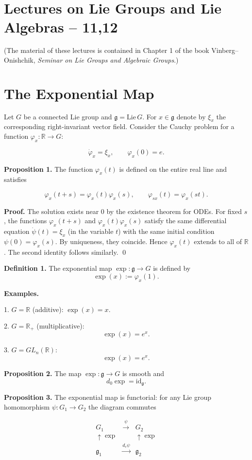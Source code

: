 \section*{Lectures on Lie Groups and Lie Algebras – 11,12}

(The material of these lectures is contained in Chapter 1 of the book
Vinberg–Onishchik, \emph{Seminar on Lie Groups and Algebraic Groups}.)

\section*{The Exponential Map}

Let $G$ be a connected Lie group and $\mathfrak g = \mathrm{Lie}\,G$.
For $x \in \mathfrak g$ denote by $\xi_x$ the corresponding right-invariant
vector field. Consider the Cauchy problem for a function
$\varphi_x : \mathbb{R} \to G$:

\[
\dot\varphi_x = \xi_x, \qquad \varphi_x(0) = e.
\]

\textbf{Proposition 1.}
The function $\varphi_x(t)$ is defined on the entire real line and satisfies

\[
\varphi_x(t+s) = \varphi_x(t)\varphi_x(s),
\qquad
\varphi_{sx}(t) = \varphi_x(st).
\]

\textbf{Proof.}
The solution exists near $0$ by the existence theorem for ODEs.
For fixed $s$, the functions $\varphi_x(t+s)$ and
$\varphi_x(t)\varphi_x(s)$ satisfy the same differential equation
$\dot\psi(t)=\xi_x$ (in the variable $t$) with the same initial condition
$\psi(0)=\varphi_x(s)$. By uniqueness, they coincide.
Hence $\varphi_x(t)$ extends to all of $\mathbb{R}$.
The second identity follows similarly.
\qed

\textbf{Definition 1.}
The exponential map $\exp : \mathfrak g \to G$ is defined by
\[
\exp(x) := \varphi_x(1).
\]

\textbf{Examples.}

1. $G=\mathbb{R}$ (additive): $\exp(x)=x$.

2. $G=\mathbb{R}_+$ (multiplicative):
\[
\exp(x)=e^x.
\]

3. $G=GL_n(\mathbb{R})$:
\[
\exp(x)=e^x.
\]

\textbf{Proposition 2.}
The map $\exp : \mathfrak g \to G$ is smooth and
\[
d_0 \exp = \mathrm{id}_{\mathfrak g}.
\]

\textbf{Proposition 3.}
The exponential map is functorial:
for any Lie group homomorphism
$\psi:G_1\to G_2$ the diagram commutes

\[
\begin{array}{ccc}
G_1 & \xrightarrow{\psi} & G_2 \\
\uparrow \exp & & \uparrow \exp \\
\mathfrak g_1 & \xrightarrow{d_e\psi} & \mathfrak g_2
\end{array}
\]

